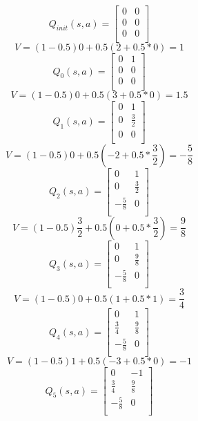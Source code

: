 \documentclass[12pt,letter]{article}
\begin{document}
\begin{multicols}{2}
\setlength{\columnsep}{1.5cm}
    \setlength{\columnseprule}{0.4pt}
\[
    Q_{init}(s,a) = 
    \begin{bmatrix}
        0 & 0\\
        0 & 0\\
        0 & 0\\
    \end{bmatrix}
\]
\[
    V = (1-0.5)0 + 0.5(2 + 0.5*0)=1
\]
\[
    Q_0(s,a) = 
    \begin{bmatrix}
        0 & 1\\
        0 & 0\\
        0 & 0\\
    \end{bmatrix}
\]
\[
    V = (1-0.5)0 + 0.5(3 + 0.5*0)=1.5
\]
\[
    Q_1(s,a) = 
    \begin{bmatrix}
        0 & 1\\
        0 & \frac32\\
        0 & 0\\
    \end{bmatrix}
\]
\[
    V = (1-0.5)0 + 0.5(-2 + 0.5*\frac32)=-\frac58
\]
\[
    Q_2(s,a) = 
    \begin{bmatrix}
        0 & 1\\
        0 & \frac32\\
        -\frac58 & 0\\
    \end{bmatrix}
\]
\[
    V = (1-0.5)\frac32 + 0.5(0 + 0.5*\frac32)=\frac98
\]
\[
    Q_3(s,a) = 
    \begin{bmatrix}
        0 & 1\\
        0 & \frac98\\
        -\frac58 & 0\\
    \end{bmatrix}
\]
\[
    V = (1-0.5)0 + 0.5(1 + 0.5*1)=\frac34
\]
\[
    Q_4(s,a) = 
    \begin{bmatrix}
        0 & 1\\
        \frac34 & \frac98\\
        -\frac58 & 0\\
    \end{bmatrix}
\]
\[
    V = (1-0.5)1 + 0.5(-3 + 0.5*0)=-1
\]
\[
    Q_5(s,a) = 
    \begin{bmatrix}
        0 & -1\\
        \frac34 & \frac98\\
        -\frac58 & 0\\
    \end{bmatrix}
\]
\end{multicols}
\end{document}
